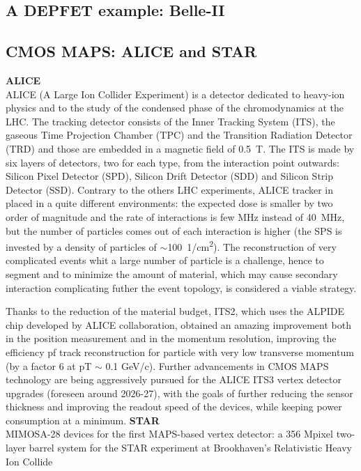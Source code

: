     \subsection{A DEPFET example: Belle-II}
        

    \subsection{CMOS MAPS: ALICE and STAR}
        \textbf{ALICE}\\
        ALICE (A Large Ion Collider Experiment) is a detector dedicated to heavy-ion physics and to the study of the condensed phase of the chromodynamics at the LHC.
        The tracking detector consists of the Inner Tracking System (ITS), the gaseous Time Projection Chamber (TPC) and the Transition Radiation Detector (TRD) and those are embedded in a magnetic field of \SI{0.5}{T}. The ITS is made by six layers of detectors, two for each type, from the interaction point outwards: Silicon Pixel Detector (SPD), Silicon Drift Detector (SDD) and Silicon Strip Detector (SSD).         
        Contrary to the others LHC experiments, ALICE tracker in placed in a quite different environments: the expected dose is smaller by two order of magnitude and the rate of interactions is few \si{MHz} instead of \SI{40}{MHz}, but the number of particles comes out of each interaction is higher (the SPS is invested by a density of particles of $\sim$\SI{100}{1/cm\squared}).  
        The reconstruction of very complicated events whit a large number of particle is a challenge, hence to segment and to minimize the amount of material, which may cause secondary interaction complicating futher the event topology, is considered a viable strategy. 

        Thanks to the reduction of the material budget, ITS2, which uses the ALPIDE chip developed by ALICE collaboration, obtained an amazing improvement both in the position measurement and in the momentum resolution, improving the efficiency pf track reconstruction for particle with very low transverse momentum (by a factor 6 at pT $\sim$ 0.1 GeV/c). Further advancements in CMOS MAPS technology are being aggressively pursued for the ALICE ITS3 vertex detector upgrades (foreseen around 2026-27), with the goals of further reducing the sensor thickness and improving the readout speed of the devices, while keeping power consumption at a minimum.
        \vspace{5mm}
        \textbf{STAR}\\
        MIMOSA-28 devices for the first MAPS-based vertex detector: a 356 Mpixel two-layer barrel system for the STAR experiment at Brookhaven’s Relativistic Heavy Ion Collide

